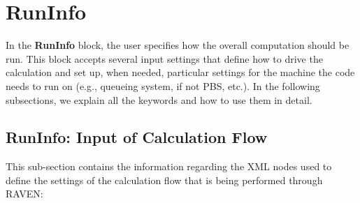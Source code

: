 \section{RunInfo}
\label{sec:RunInfo}
In the \textbf{RunInfo} block, the user specifies how the overall computation
should be run.
%
This block accepts several input settings that define how to drive the
calculation and set up, when needed, particular settings for the machine the
code needs to run on (e.g., queueing system, if not PBS, etc.).
%
In the following subsections, we explain all the keywords and how to use them in
detail.
\subsection{RunInfo: Input of Calculation Flow}
\label{subsec:runinfoCalcFlow}
This sub-section contains the information regarding the XML nodes used to define
the settings of the calculation flow that is being performed through RAVEN:

